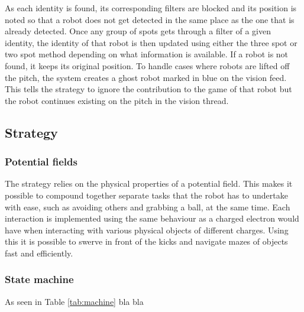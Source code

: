 \documentclass[a4paper,12pt]{article}
\begin{document}
\medskip

As each identity is found, its corresponding filters are blocked and its position is noted so that a robot does not get detected in the same place as the one that is already detected. Once any group of spots gets through a filter of a given identity, the identity of that robot is then updated using either the three spot or two spot method depending on what information is available. If a robot is not found, it keeps its original position. To handle cases where robots are lifted off the pitch, the system creates a ghost robot marked in blue on the vision feed. This tells the strategy to ignore the contribution to the game of that robot but the robot continues existing on the pitch in the vision thread.

\subsection{Strategy}

\subsubsection{Potential fields}

The strategy relies on the physical properties of a potential field. This makes it possible to compound together separate tasks that the robot has to undertake with ease, such as avoiding others and grabbing a ball, at the same time. Each interaction is implemented using the same behaviour as a charged electron would have when interacting with various physical objects of different charges. Using this it is possible to swerve in front of the kicks and navigate mazes of objects fast and efficiently. 

\subsubsection{State machine}

As seen in Table \ref{tab:machine} bla bla
\end{document}
